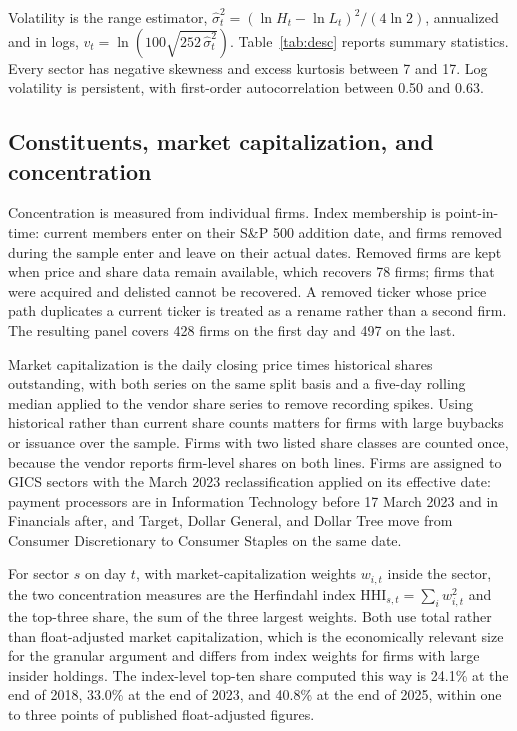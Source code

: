 \documentclass[11pt]{article}
\begin{document}
Volatility is the \citet{parkinson1980} range estimator, $\hat\sigma^2_t = (\ln H_t - \ln L_t)^2/(4\ln 2)$, annualized and in logs, $v_t = \ln(100\sqrt{252\,\hat\sigma^2_t})$. Table~\ref{tab:desc} reports summary statistics. Every sector has negative skewness and excess kurtosis between 7 and 17. Log volatility is persistent, with first-order autocorrelation between 0.50 and 0.63.

\subsection{Constituents, market capitalization, and concentration}\label{sec:const}

Concentration is measured from individual firms. Index membership is point-in-time: current members enter on their S\&P 500 addition date, and firms removed during the sample enter and leave on their actual dates. Removed firms are kept when price and share data remain available, which recovers 78 firms; firms that were acquired and delisted cannot be recovered. A removed ticker whose price path duplicates a current ticker is treated as a rename rather than a second firm. The resulting panel covers 428 firms on the first day and 497 on the last.

Market capitalization is the daily closing price times historical shares outstanding, with both series on the same split basis and a five-day rolling median applied to the vendor share series to remove recording spikes. Using historical rather than current share counts matters for firms with large buybacks or issuance over the sample. Firms with two listed share classes are counted once, because the vendor reports firm-level shares on both lines. Firms are assigned to GICS sectors with the March 2023 reclassification applied on its effective date: payment processors are in Information Technology before 17 March 2023 and in Financials after, and Target, Dollar General, and Dollar Tree move from Consumer Discretionary to Consumer Staples on the same date.

For sector $s$ on day $t$, with market-capitalization weights $w_{i,t}$ inside the sector, the two concentration measures are the Herfindahl index $\text{HHI}_{s,t} = \sum_i w_{i,t}^2$ and the top-three share, the sum of the three largest weights. Both use total rather than float-adjusted market capitalization, which is the economically relevant size for the granular argument and differs from index weights for firms with large insider holdings. The index-level top-ten share computed this way is 24.1\% at the end of 2018, 33.0\% at the end of 2023, and 40.8\% at the end of 2025, within one to three points of published float-adjusted figures.
\end{document}

